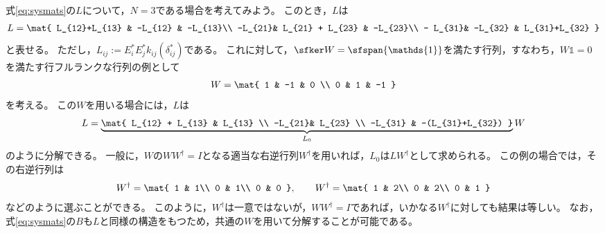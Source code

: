 \documentclass[tombow,dvipdfmx]{corona-a5}
\begin{document}
\begin{例}[同一の核空間をもつ行列による分解]\label{ex:Ldec}
式\ref{eq:sysmats}の$L$について，$N=3$である場合を考えてみよう。
このとき，$L$は
\begin{align*}
L=
\mat{
L_{12}+L_{13} & -L_{12} & -L_{13}\\
-L_{21}& L_{21} + L_{23} & -L_{23}\\
- L_{31}& -L_{32} & L_{31}+L_{32}
}
\end{align*}
と表せる。
ただし，$L_{ij}:= E_i^* E_j^* k_{ij}(\delta_{ij}^*)$である。
これに対して，$\sfker W = \sfspan\{ \mathds{1}\}$を満たす行列，すなわち，$W \mathds{1}=0$を満たす行フルランクな行列の例として
\begin{align*}
W=\mat{
1 & -1 & 0 \\
0 & 1 & -1
}
\end{align*}
を考える。
この$W$を用いる場合には，$L$は
\begin{align*}
L = \underbrace{
\mat{
L_{12} + L_{13} & L_{13} \\
-L_{21}& L_{23} \\
-L_{31} & -(L_{31}+L_{32})
}
}_{L_0}
W
\end{align*}
のように分解できる。
一般に，$W$の$WW^{\dagger}=I$となる適当な右逆行列$W^{\dagger}$を用いれば，$L_0$は$LW^{\dagger}$として求められる。
この例の場合では，その右逆行列は
\begin{align*}
W^{\dagger} = \mat{
1 & 1\\
0 & 1\\
0 & 0
}
,\qquad
W^{\dagger} = \mat{
1 & 2\\
0 & 2\\
0 & 1
}
\end{align*}
などのように選ぶことができる。
このように，$W^{\dagger}$は一意ではないが，$WW^{\dagger}=I$であれば，いかなる$W^{\dagger}$に対しても結果は等しい。
なお，式\ref{eq:sysmats}の$B$も$L$と同様の構造をもつため，共通の$W$を用いて分解することが可能である。
\end{例}
\end{document}
